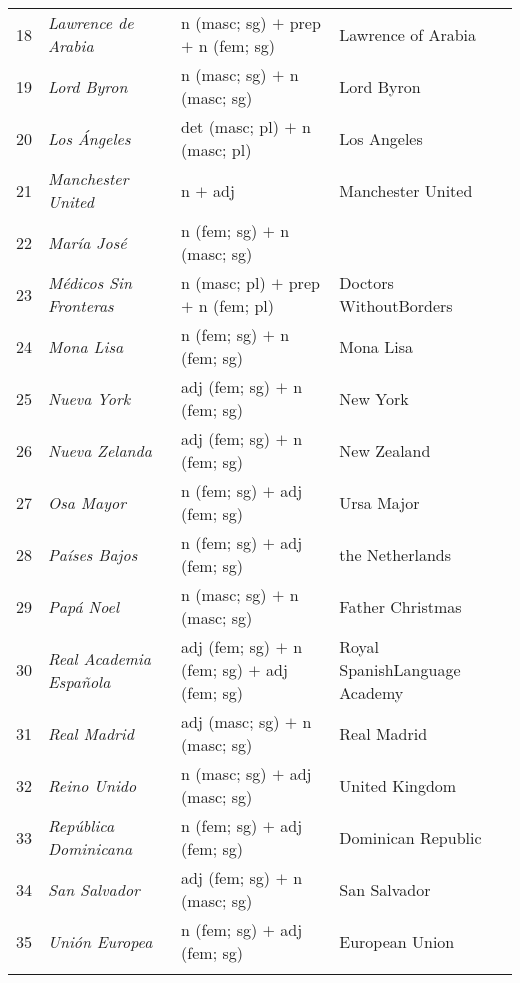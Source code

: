 \documentclass[output=paper]{langsci/langscibook}
\begin{document}
\begin{table}
\begin{tabularx}{\textwidth}{c>{\raggedright}p{3cm}Qp{3cm}}
18 & \textit{Lawrence de Arabia} &  n (masc; sg) $+$ prep $+$  n (fem; sg) & Lawrence of Arabia \\
19 & \textit{Lord Byron} & n (masc; sg) $+$ n (masc; sg) & Lord Byron \\
20 & \textit{Los Ángeles} & det (masc; pl) $+$ n (masc; pl) & Los Angeles \\
21 & \textit{Manchester United} & n $+$ adj & Manchester United \\
22 & \textit{María José} & n (fem; sg) $+$ n (masc; sg) &  \\
23 & \textit{Médicos Sin Fronteras} & n (masc; pl) $+$ prep $+$ n (fem; pl) &   Doctors Without\newline  Borders \\
24 & \textit{Mona Lisa} & n (fem; sg) $+$ n (fem; sg) & Mona Lisa \\
25 & \textit{Nueva York} & adj (fem; sg) $+$ n (fem; sg) & New York \\
26 & \textit{Nueva Zelanda} & adj (fem; sg) $+$ n (fem; sg) & New Zealand \\
27 & \textit{Osa Mayor} & n (fem; sg) $+$ adj (fem; sg) & Ursa Major \\
28 & \textit{Países Bajos} & n (fem; sg)  $+$ adj (fem; sg) & the Netherlands \\
29 & \textit{Papá Noel} & n (masc; sg) $+$ n (masc; sg) & Father Christmas \\
30 & \textit{Real Academia Española} & adj (fem; sg) $+$ n (fem; sg) $+$   adj (fem; sg) & Royal Spanish\newline Language Academy  \\
31 & \textit{Real Madrid} & adj (masc; sg) $+$ n (masc; sg) & Real Madrid \\
32 & \textit{Reino Unido} & n (masc; sg) $+$ adj (masc; sg) & United Kingdom \\
33 & \textit{República Dominicana} & n (fem; sg)  $+$ adj (fem; sg) & Dominican Republic \\
34 & \textit{San Salvador} & adj (fem; sg) $+$ n (masc; sg) & San Salvador \\
35 & \textit{Unión Europea} & n (fem; sg) $+$ adj (fem; sg) & European Union\\
\lspbottomrule
\end{tabularx} 
\end{table}
\end{document}

